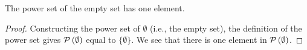 \documentclass[main.tex]{subfiles}
\begin{document}
\subproblem{}\label{8d}

\begin{thm}[\(\card{A} = 0 \implies \card{\powerset{A}} = 1\)]
	The power set of the empty set has one element.
\end{thm}
\begin{proof}
	Constructing the power set of \(\emptyset\) (i.e., the empty set), the
	definition of the power set gives \(\mathcal{P}\left(\emptyset\right)\) equal to
	\(\{\emptyset\}\). We see that there is one element in
	\(\mathcal{P}\left(\emptyset\right)\).
\end{proof}
\end{document}
